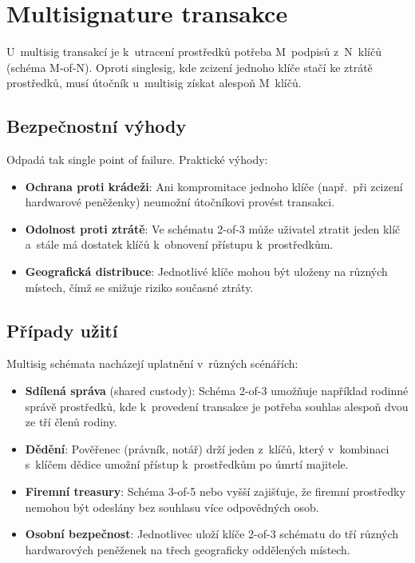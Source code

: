 \section{Multisignature transakce}
\label{sec:multisig}

U~multisig transakcí je k~utracení prostředků potřeba M~podpisů z~N~klíčů
(schéma M-of-N). Oproti singlesig, kde zcizení jednoho klíče stačí ke ztrátě
prostředků, musí útočník u~multisig získat alespoň M~klíčů.

\subsection{Bezpečnostní výhody}
\label{sec:multisig-security}

Odpadá tak single point of failure. Praktické výhody:

\begin{itemize}
  \item \textbf{Ochrana proti krádeži}: Ani kompromitace jednoho klíče (např.\
    při zcizení hardwarové peněženky) neumožní útočníkovi provést transakci.
  \item \textbf{Odolnost proti ztrátě}: Ve schématu 2-of-3 může uživatel
    ztratit jeden klíč a~stále má dostatek klíčů k~obnovení přístupu
    k~prostředkům.
  \item \textbf{Geografická distribuce}: Jednotlivé klíče mohou být uloženy na
    různých místech, čímž se snižuje riziko současné ztráty.
\end{itemize}

\subsection{Případy užití}
\label{sec:multisig-usecases}

Multisig schémata nacházejí uplatnění v~různých scénářích:

\begin{itemize}
  \item \textbf{Sdílená správa} (shared custody): Schéma 2-of-3 umožňuje
    například rodinné správě prostředků, kde k~provedení transakce je potřeba
    souhlas alespoň dvou ze tří členů rodiny.
  \item \textbf{Dědění}: Pověřenec (právník, notář) drží jeden z~klíčů, který
    v~kombinaci s~klíčem dědice umožní přístup k~prostředkům po úmrtí majitele.
  \item \textbf{Firemní treasury}: Schéma 3-of-5 nebo vyšší zajišťuje, že
    firemní prostředky nemohou být odeslány bez souhlasu více odpovědných osob.
  \item \textbf{Osobní bezpečnost}: Jednotlivec uloží klíče 2-of-3 schématu do
    tří různých hardwarových peněženek na třech geograficky oddělených místech.
\end{itemize}

